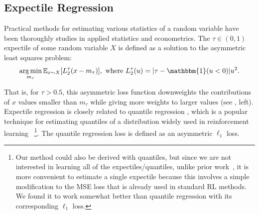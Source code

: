 \documentclass{article} %
\begin{document}
\vspace{-0.1cm}
\subsection{Expectile Regression} 
Practical methods for estimating various statistics of a random variable have been thoroughly studies in applied statistics and econometrics. The $\tau \in (0, 1)$ expectile of some random variable $X$ is defined as a solution to the asymmetric least squares problem:
$$\argmin_{m_\tau} \E_{x\sim X}[L_2^\tau(x-m_\tau)],
\mbox{ where } L_2^\tau(u) = |\tau-\mathbbm{1}(u < 0)|u^2.$$

\vspace{-0.2cm}
That is, for $\tau > 0.5$, this asymmetric loss function downweights the contributions of $x$ values smaller than $m_\tau$ while giving more weights to larger values (see , left). 
Expectile regression is closely related to quantile regression \citep{koenker2001quantile}, which is a popular technique for estimating quantiles of a distribution widely used in reinforcement learning~\citep{dabney2018distributional, dabney2018implicit}
\footnote{Our method could also be derived with quantiles, but since we are not interested in learning all of the expectiles/quantiles, unlike prior work~\citep{dabney2018distributional, dabney2018implicit}, it is more convenient to estimate a single expectile because this involves a simple modification to the MSE loss that is already used in standard RL methods. We found it to work somewhat better than quantile regression with its corresponding $\ell_1$ loss.}.
The quantile regression loss is defined as an asymmetric $\ell_1$ loss.
\end{document}

